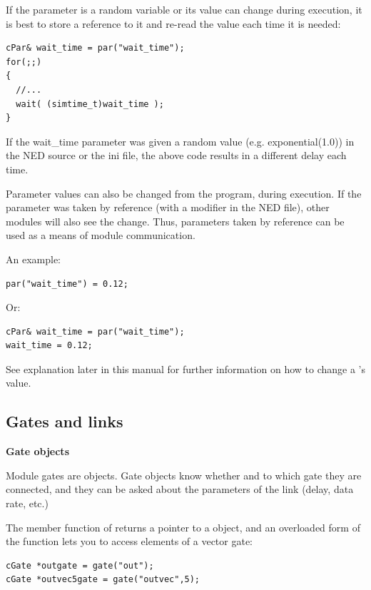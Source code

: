 If the parameter is a random variable or its value can change
during execution, it is best to store a reference to it and re-read
the value each time it is needed:

\begin{verbatim}
cPar& wait_time = par("wait_time");
for(;;)
{
  //...
  wait( (simtime_t)wait_time );
}
\end{verbatim}

If the wait\_time parameter was given a random value (e.g. exponential(1.0))
in the NED source or the ini file, the above code results in
a different delay each time.

Parameter values can also be changed from the program, during
execution. If the parameter was taken by reference
 (with a
 modifier in the NED file), other modules
will also see the change.  Thus, parameters taken by reference can be
used as a means of module communication.


An example:

\begin{verbatim}
par("wait_time") = 0.12;
\end{verbatim}

Or:

\begin{verbatim}
cPar& wait_time = par("wait_time");
wait_time = 0.12;
\end{verbatim}


See  explanation later in this manual for further information
on how to change a 's value.



\subsection{Gates and links}

\textbf{Gate objects}


Module gates are  objects. Gate objects
know whether and to which gate they are connected, and they can be
asked about the parameters of the link (delay, data rate, etc.)

The  member function of  returns a
pointer to a  object, and an overloaded form of the
function lets you to access elements of a vector gate:

\begin{verbatim}
cGate *outgate = gate("out");
cGate *outvec5gate = gate("outvec",5);
\end{verbatim}


